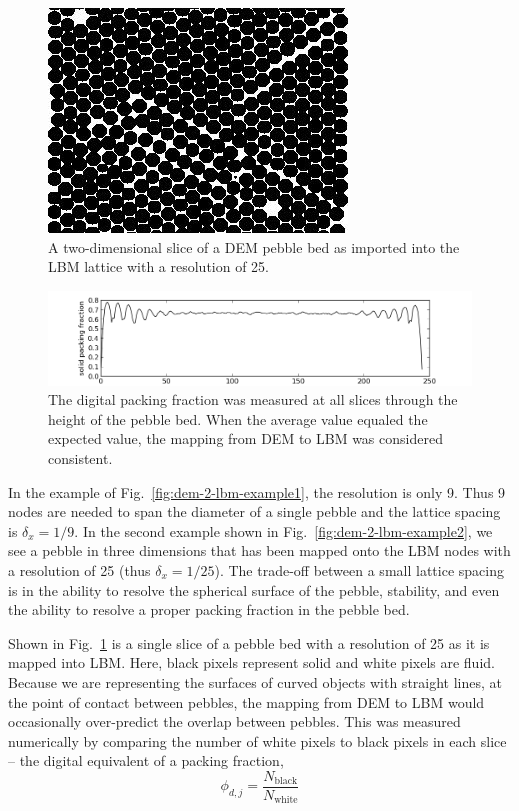 \begin{figure}[ht]
	\centering
	\includegraphics[width=\doubleimagewidth]{chapters/figures/lbm/crossSection0024.jpg}
	\caption{A two-dimensional slice of a DEM pebble bed as imported into the LBM lattice with a resolution of 25.}\label{fig:dem-2-lbm-example3}
\end{figure}
\begin{figure}[ht]
	\centering
	\includegraphics[width=\textwidth]{chapters/figures/lbm/palabos_packing_fraction}
	\caption{The digital packing fraction was measured at all slices through the height of the pebble bed. When the average value equaled the expected value, the mapping from DEM to LBM was considered consistent.}\label{fig:dem-2-lbm-packing-fraction}
\end{figure}

In the example of Fig.~\ref{fig:dem-2-lbm-example1}, the resolution is only 9. Thus 9 nodes are needed to span the diameter of a single pebble and the lattice spacing is $\delta_x = 1/9$. In the second example shown in Fig.~\ref{fig:dem-2-lbm-example2}, we see a pebble in three dimensions that has been mapped onto the LBM nodes with a resolution of 25 (thus $\delta_x = 1/25$). The trade-off between a small lattice spacing is in the ability to resolve the spherical surface of the pebble, stability, and even the ability to resolve a proper packing fraction in the pebble bed. 

Shown in Fig.~\ref{fig:dem-2-lbm-example3} is a single slice of a pebble bed with a resolution of 25 as it is mapped into LBM. Here, black pixels represent solid and white pixels are fluid. Because we are representing the surfaces of curved objects with straight lines, at the point of contact between pebbles, the mapping from DEM to LBM would occasionally over-predict the overlap between pebbles. This was measured numerically by comparing the number of white pixels to black pixels in each slice -- the digital equivalent of a packing fraction,
\begin{equation}
	\phi_{d,j} = \frac{N_\text{black}}{N_\text{white}}
\end{equation}

